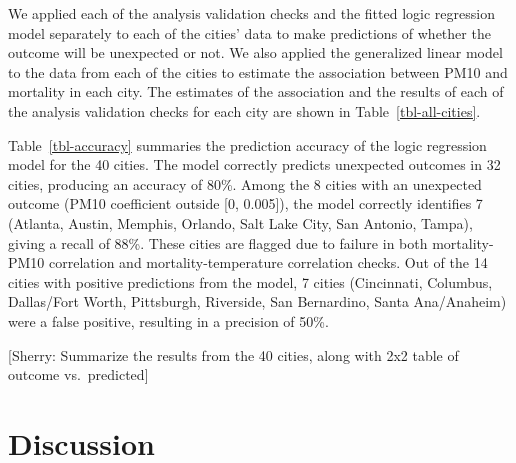\documentclass[
  12pt,
]{interact}
\begin{document}
We applied each of the analysis validation checks and the fitted logic
regression model separately to each of the cities' data to make
predictions of whether the outcome will be unexpected or not. We also
applied the generalized linear model to the data from each of the cities
to estimate the association between PM10 and mortality in each city. The
estimates of the association and the results of each of the analysis
validation checks for each city are shown in Table~\ref{tbl-all-cities}.

\begin{table}

\caption{\label{tbl-accuracy}}


\end{table}%

Table~\ref{tbl-accuracy} summaries the prediction accuracy of the logic
regression model for the 40 cities. The model correctly predicts
unexpected outcomes in 32 cities, producing an accuracy of 80\%. Among
the 8 cities with an unexpected outcome (PM10 coefficient outside {[}0,
0.005{]}), the model correctly identifies 7 (Atlanta, Austin, Memphis,
Orlando, Salt Lake City, San Antonio, Tampa), giving a recall of 88\%.
These cities are flagged due to failure in both mortality-PM10
correlation and mortality-temperature correlation checks. Out of the 14
cities with positive predictions from the model, 7 cities (Cincinnati,
Columbus, Dallas/Fort Worth, Pittsburgh, Riverside, San Bernardino,
Santa Ana/Anaheim) were a false positive, resulting in a precision of
50\%.

{[}Sherry: Summarize the results from the 40 cities, along with 2x2
table of outcome vs.~predicted{]}

\section{Discussion}\label{sec-discussion}
\end{document}
